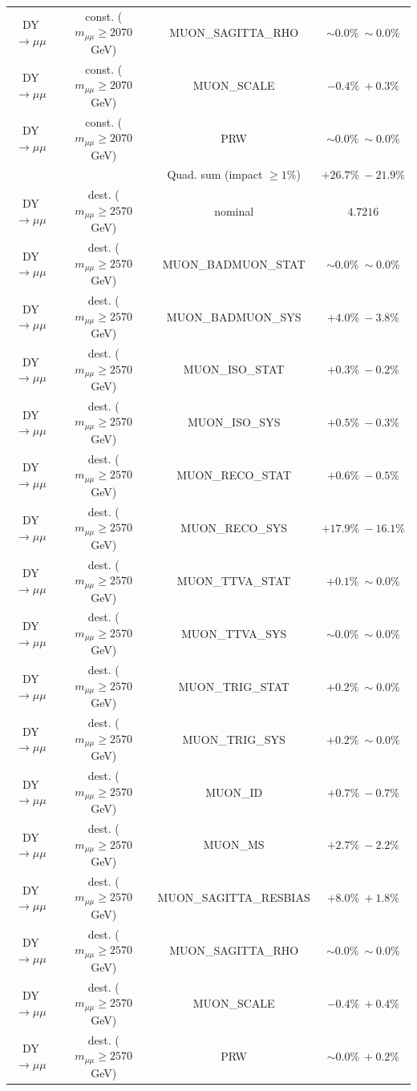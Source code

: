 {\begin{table}[]
\begin{center}
\begin{tabular}{|c|c|c|c|}
DY$\rightarrow \mu\mu$ & const. ($m_{\mu\mu} \geq 2070$ GeV) & MUON\_SAGITTA\_RHO & $\sim 0.0\% \ \sim 0.0\%$ \\
DY$\rightarrow \mu\mu$ & const. ($m_{\mu\mu} \geq 2070$ GeV) & MUON\_SCALE & $  -0.4\% \ + 0.3\%$ \\
DY$\rightarrow \mu\mu$ & const. ($m_{\mu\mu} \geq 2070$ GeV) & PRW & $\sim 0.0\% \ \sim 0.0\%$ \\
\hline
 & & Quad. sum (impact $\geq 1\%$) & $+ 26.7\% \   -21.9\%$ \\
\hline
DY$\rightarrow \mu\mu$ & dest. ($m_{\mu\mu} \geq 2570$ GeV) & nominal & $4.7216$ \\
DY$\rightarrow \mu\mu$ & dest. ($m_{\mu\mu} \geq 2570$ GeV) & MUON\_BADMUON\_STAT & $\sim 0.0\% \ \sim 0.0\%$ \\
DY$\rightarrow \mu\mu$ & dest. ($m_{\mu\mu} \geq 2570$ GeV) & MUON\_BADMUON\_SYS & $+ 4.0\% \   -3.8\%$ \\
DY$\rightarrow \mu\mu$ & dest. ($m_{\mu\mu} \geq 2570$ GeV) & MUON\_ISO\_STAT & $+ 0.3\% \   -0.2\%$ \\
DY$\rightarrow \mu\mu$ & dest. ($m_{\mu\mu} \geq 2570$ GeV) & MUON\_ISO\_SYS & $+ 0.5\% \   -0.3\%$ \\
DY$\rightarrow \mu\mu$ & dest. ($m_{\mu\mu} \geq 2570$ GeV) & MUON\_RECO\_STAT & $+ 0.6\% \   -0.5\%$ \\
DY$\rightarrow \mu\mu$ & dest. ($m_{\mu\mu} \geq 2570$ GeV) & MUON\_RECO\_SYS & $+ 17.9\% \   -16.1\%$ \\
DY$\rightarrow \mu\mu$ & dest. ($m_{\mu\mu} \geq 2570$ GeV) & MUON\_TTVA\_STAT & $+ 0.1\% \ \sim 0.0\%$ \\
DY$\rightarrow \mu\mu$ & dest. ($m_{\mu\mu} \geq 2570$ GeV) & MUON\_TTVA\_SYS & $\sim 0.0\% \ \sim 0.0\%$ \\
DY$\rightarrow \mu\mu$ & dest. ($m_{\mu\mu} \geq 2570$ GeV) & MUON\_TRIG\_STAT & $+ 0.2\% \ \sim 0.0\%$ \\
DY$\rightarrow \mu\mu$ & dest. ($m_{\mu\mu} \geq 2570$ GeV) & MUON\_TRIG\_SYS & $+ 0.2\% \ \sim 0.0\%$ \\
DY$\rightarrow \mu\mu$ & dest. ($m_{\mu\mu} \geq 2570$ GeV) & MUON\_ID & $+ 0.7\% \   -0.7\%$ \\
DY$\rightarrow \mu\mu$ & dest. ($m_{\mu\mu} \geq 2570$ GeV) & MUON\_MS & $+ 2.7\% \   -2.2\%$ \\
DY$\rightarrow \mu\mu$ & dest. ($m_{\mu\mu} \geq 2570$ GeV) & MUON\_SAGITTA\_RESBIAS & $+ 8.0\% \ + 1.8\%$ \\
DY$\rightarrow \mu\mu$ & dest. ($m_{\mu\mu} \geq 2570$ GeV) & MUON\_SAGITTA\_RHO & $\sim 0.0\% \ \sim 0.0\%$ \\
DY$\rightarrow \mu\mu$ & dest. ($m_{\mu\mu} \geq 2570$ GeV) & MUON\_SCALE & $  -0.4\% \ + 0.4\%$ \\
DY$\rightarrow \mu\mu$ & dest. ($m_{\mu\mu} \geq 2570$ GeV) & PRW & $\sim 0.0\% \ + 0.2\%$ \\
\hline
\hline
\end{tabular}
\label{tab:ciExpVariationBonanza}
\end{center}
\end{table}
\clearpage
}

